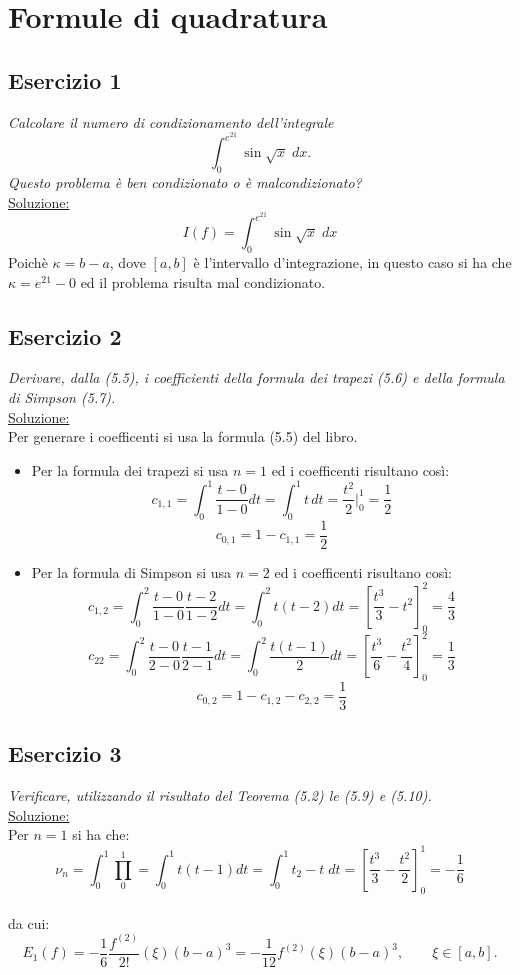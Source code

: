 \chapter{Formule di quadratura}
\label{chap:Cap5}

\section{Esercizio 1}
\label{sub:es1}
\emph{Calcolare il numero di condizionamento dell'integrale
$$\int_0^{e^{21}}\sin\sqrt{x}\;dx.$$
Questo problema è ben condizionato o è malcondizionato?}\\
\underline{Soluzione:}\\
$$ I(f)=\int_{0}^{e^{21}}\sin\sqrt{x}\;dx $$
Poichè $\kappa = b-a$, dove $[a,b]$ è l'intervallo d'integrazione, in questo caso si
ha che $\kappa = {e^{21}}-0$ ed il problema risulta mal condizionato.

\section{Esercizio 2}
\label{sub:es2}
\emph{Derivare, dalla (5.5), i coefficienti della formula dei trapezi (5.6) e della formula di Simpson (5.7).}\\
\underline{Soluzione:}\\
Per generare i coefficenti si usa la formula (5.5) del libro.
\begin{itemize}
\item Per la formula dei trapezi si usa $n=1$ ed i coefficenti risultano così:
\[
c_{1,1}=\int_{0}^{1}\frac{t-0}{1-0}dt=\int_{0}^{1}t\, dt=\frac{t^{2}}{2}|_{0}^{1}=\frac{1}{2}
\]
\[
c_{0,1}=1-c_{1,1}=\frac{1}{2}
\]

\item Per la formula di Simpson si usa $n=2$ ed i coefficenti risultano così:
\[
c_{1,2}=\int_{0}^{2}\frac{t-0}{1-0}\frac{t-2}{1-2}dt=\int_{0}^{2}t(t-2)dt=\left[\frac{t^{3}}{3}-t^{2}\right]_{0}^{2}=\frac{4}{3}
\]
\[
c_{22}=\int_{0}^{2}\frac{t-0}{2-0}\frac{t-1}{2-1}dt=\int_{0}^{2}\frac{t(t-1)}{2}dt=\left[\frac{t^{3}}{6}-\frac{t^{2}}{4}\right]_{0}^{2}=\frac{1}{3}
\]
\[
c_{0,2}=1-c_{1,2}-c_{2,2}=\frac{1}{3}
\]
\end{itemize}

\section{Esercizio 3}
\label{sub:es3}
\emph{Verificare, utilizzando il risultato del Teorema (5.2) le (5.9) e (5.10).}\\
\underline{Soluzione:}\\
Per $n=1$ si ha che:\\
$$\nu_{n}=\int_{0}^{1}\prod_{0}^{1}=\int_{0}^{1}t(t-1)dt=\int_{0}^{1}t_{2}-t\;dt=\left[\frac{t^{3}}{3}-\frac{t^2}{2}\right]_{0}^{1}=-\frac{1}{6}$$\\
da cui:\\
$$E_{1}(f)=-\frac{1}{6}\frac{f^{(2)}}{2!}(\xi)(b-a)^{3}=-\frac{1}{12} f^{(2)}(\xi)(b-a)^{3},\qquad \xi\in[a,b].$$

